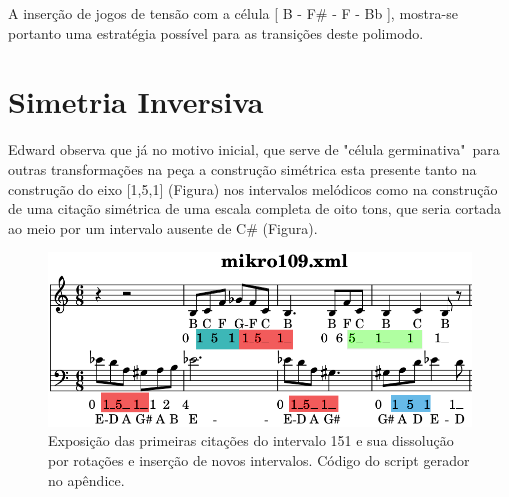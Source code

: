 \documentclass[
	12pt,				%
	openright,			%
	twoside,			%
	a4paper,			%
	english,			%
	french,				%
	spanish,			%
	brazil				%
	]{abntex2}
\begin{document}
A inserção de jogos de tensão com a célula [ B - F\# - F - Bb ], mostra-se portanto uma estratégia possível para as transições deste polimodo.








 

  



\section{Simetria Inversiva}

Edward  observa que já no motivo inicial, que serve de "célula germinativa"\ para outras transformações na peça a construção simétrica esta presente tanto na construção do eixo [1,5,1] (Figura) nos intervalos melódicos como na construção de uma citação simétrica de uma escala completa de oito tons, que seria cortada ao meio por um intervalo ausente de C\# (Figura).

\begin{figure}[!h]
	\caption{\label{fig_grafico}Exposição das primeiras citações do intervalo 151 e sua dissolução por rotações e inserção de novos intervalos. Código do script gerador no apêndice.}
	\begin{center}
	    \includegraphics[scale=0.5]{estudosM21/contornoM109.png}
	\end{center}
\end{figure}
\end{document}
